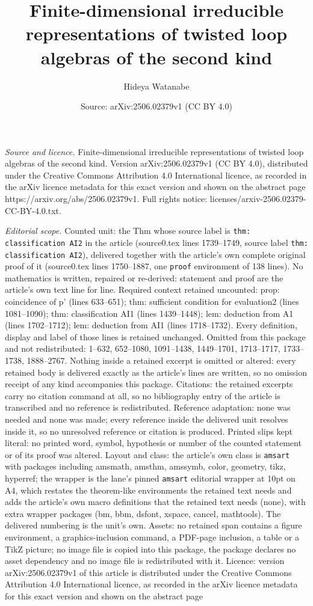 \documentclass[10pt,a4paper]{amsart}
\title[Finite-dimensional irreducible representations of twisted lo]{Finite-dimensional irreducible representations of twisted loop algebras of the second kind}
\author{Hideya Watanabe}
\date{Source: arXiv:2506.02379v1 (CC BY 4.0)}
\begin{document}
\maketitle

\noindent\emph{Source and licence.} Finite-dimensional irreducible representations of twisted loop algebras of the second kind. Version arXiv:2506.02379v1 (CC BY 4.0), distributed under the Creative Commons Attribution 4.0 International licence, as recorded in the arXiv licence metadata for this exact version and shown on the abstract page https://arxiv.org/abs/2506.02379v1. Full rights notice: licenses/arxiv-2506.02379-CC-BY-4.0.txt.\par\smallskip

\noindent\textit{Editorial scope.} Counted unit: the Thm whose source label is \texttt{thm: classification AI2} in the article (source0.tex lines 1739--1749, source label \texttt{thm: classification AI2}), delivered together with the article's own complete original proof of it (source0.tex lines 1750--1887, one \texttt{proof} environment of 138 lines). No mathematics is written, repaired or re-derived: statement and proof are the article's own text line for line. Required context retained uncounted: prop: coincidence of p' (lines 633--651); thm: sufficient condition for evaluation2 (lines 1081--1090); thm: classification AI1 (lines 1439--1448); lem: deduction from A1 (lines 1702--1712); lem: deduction from AI1 (lines 1718--1732). Every definition, display and label of those lines is retained unchanged. Omitted from this package and not redistributed: 1--632, 652--1080, 1091--1438, 1449--1701, 1713--1717, 1733--1738, 1888--2767. Nothing inside a retained excerpt is omitted or altered: every retained body is delivered exactly as the article's lines are written, so no omission receipt of any kind accompanies this package. Citations: the retained excerpts carry no citation command at all, so no bibliography entry of the article is transcribed and no reference is redistributed. Reference adaptation: none was needed and none was made; every reference inside the delivered unit resolves inside it, so no unresolved reference or citation is produced. Printed slips kept literal: no printed word, symbol, hypothesis or number of the counted statement or of its proof was altered. Layout and class: the article's own class is \texttt{amsart} with packages including amsmath, amsthm, amssymb, color, geometry, tikz, hyperref; the wrapper is the lane's pinned \texttt{amsart} editorial wrapper at 10pt on A4, which restates the theorem-like environments the retained text needs and adds the article's own macro definitions that the retained text needs (none), with extra wrapper packages (bm, bbm, dsfont, xspace, cancel, mathtools). The delivered numbering is the unit's own. Assets: no retained span contains a figure environment, a graphics-inclusion command, a PDF-page inclusion, a table or a TikZ picture; no image file is copied into this package, the package declares no asset dependency and no image file is redistributed with it. Licence: version arXiv:2506.02379v1 of this article is distributed under the Creative Commons Attribution 4.0 International licence, as recorded in the arXiv licence metadata for this exact version and shown on the abstract page 
\end{document}
